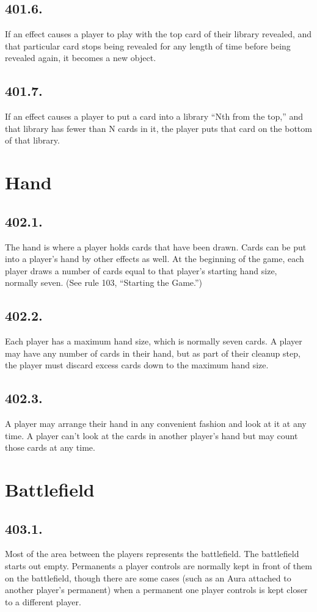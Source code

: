 \subsection*{401.6.}
If an effect causes a player to play with the top card of their library revealed, and that particular card stops being revealed for any length of time before being revealed again, it becomes a new object.

\subsection*{401.7.}
If an effect causes a player to put a card into a library “Nth from the top,” and that library has fewer than N cards in it, the player puts that card on the bottom of that library.

\section{Hand}
\subsection*{402.1.}
The hand is where a player holds cards that have been drawn. Cards can be put into a player’s hand by other effects as well. At the beginning of the game, each player draws a number of cards equal to that player’s starting hand size, normally seven. (See rule 103, “Starting the Game.”)

\subsection*{402.2.}
Each player has a maximum hand size, which is normally seven cards. A player may have any number of cards in their hand, but as part of their cleanup step, the player must discard excess cards down to the maximum hand size.

\subsection*{402.3.}
A player may arrange their hand in any convenient fashion and look at it at any time. A player can’t look at the cards in another player’s hand but may count those cards at any time.

\section{Battlefield}
\subsection*{403.1.}
Most of the area between the players represents the battlefield. The battlefield starts out empty. Permanents a player controls are normally kept in front of them on the battlefield, though there are some cases (such as an Aura attached to another player’s permanent) when a permanent one player controls is kept closer to a different player.

